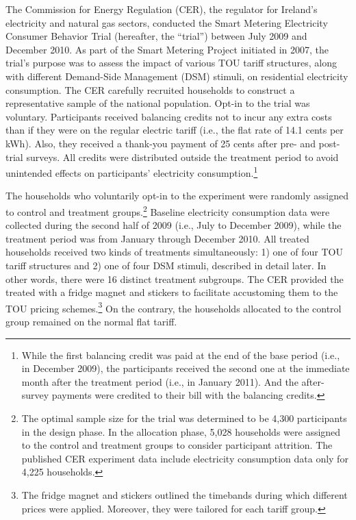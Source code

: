 The Commission for Energy Regulation (CER), the regulator for Ireland's electricity and natural gas sectors, conducted the Smart Metering Electricity Consumer Behavior Trial (hereafter, the ``trial'') between July 2009 and December 2010. As part of the Smart Metering Project initiated in 2007, the trial's purpose was to assess the impact of various TOU tariff structures, along with different Demand-Side Management (DSM) stimuli, on residential electricity consumption. The CER carefully recruited households to construct a representative sample of the national population. Opt-in to the trial was voluntary. Participants received balancing credits not to incur any extra costs than if they were on the regular electric tariff (i.e., the flat rate of 14.1 cents per kWh). Also, they received a thank-you payment of 25 cents after pre- and post-trial surveys. All credits were distributed outside the treatment period to avoid unintended effects on participants' electricity consumption.\footnote{While the first balancing credit was paid at the end of the base period (i.e., in December 2009), the participants received the second one at the immediate month after the treatment period (i.e., in January 2011). And the after-survey payments were credited to their bill with the balancing credits.}

The households who voluntarily opt-in to the experiment were randomly assigned to control and treatment groups.\footnote{The optimal sample size for the trial was determined to be 4,300 participants in the design phase. In the allocation phase, 5,028 households were assigned to the control and treatment groups to consider participant attrition. The published CER experiment data include electricity consumption data only for 4,225 households.} Baseline electricity consumption data were collected during the second half of 2009 (i.e., July to December 2009), while the treatment period was from January through December 2010. All treated households received two kinds of treatments simultaneously: 1) one of four TOU tariff structures and 2) one of four DSM stimuli, described in detail later. In other words, there were 16 distinct treatment subgroups. The CER provided the treated with a fridge magnet and stickers to facilitate accustoming them to the TOU pricing schemes.\footnote{The fridge magnet and stickers outlined the timebands during which different prices were applied. Moreover, they were tailored for each tariff group.} On the contrary, the households allocated to the control group remained on the normal flat tariff.

